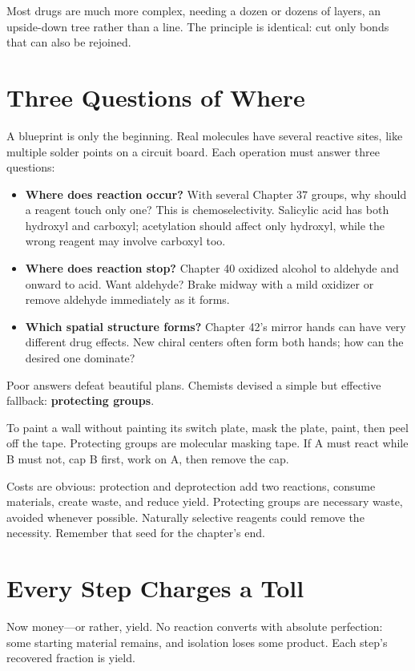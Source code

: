 Most drugs are much more complex, needing a dozen or dozens of layers, an upside-down tree rather than a line. The principle is identical: cut only bonds that can also be rejoined.

\section{Three Questions of Where}

A blueprint is only the beginning. Real molecules have several reactive sites, like multiple solder points on a circuit board. Each operation must answer three questions:

\begin{itemize}[itemsep=2pt]
\item \textbf{Where does reaction occur?} With several Chapter 37 groups, why should a reagent touch only one? This is chemoselectivity. Salicylic acid has both hydroxyl and carboxyl; acetylation should affect only hydroxyl, while the wrong reagent may involve carboxyl too.
\item \textbf{Where does reaction stop?} Chapter 40 oxidized alcohol to aldehyde and onward to acid. Want aldehyde? Brake midway with a mild oxidizer or remove aldehyde immediately as it forms.
\item \textbf{Which spatial structure forms?} Chapter 42's mirror hands can have very different drug effects. New chiral centers often form both hands; how can the desired one dominate?
\end{itemize}

Poor answers defeat beautiful plans. Chemists devised a simple but effective fallback: \textbf{protecting groups}.

To paint a wall without painting its switch plate, mask the plate, paint, then peel off the tape. Protecting groups are molecular masking tape. If A must react while B must not, cap B first, work on A, then remove the cap.

Costs are obvious: protection and deprotection add two reactions, consume materials, create waste, and reduce yield. Protecting groups are necessary waste, avoided whenever possible. Naturally selective reagents could remove the necessity. Remember that seed for the chapter's end.

\section{Every Step Charges a Toll}

Now money---or rather, yield. No reaction converts with absolute perfection: some starting material remains, and isolation loses some product. Each step's recovered fraction is yield.

